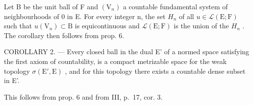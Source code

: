 Let B be the unit ball of F and \((\mathrm{V}_{n})\) a countable fundamental system of neighbourhoods of 0 in E. For every integer n, the set \(H_{n}\) of all \(u \in \mathcal{L}(\mathrm{E}; \mathrm{F})\) such that \(u(\mathrm{V}_{n}) \subset \mathrm{B}\) is equicontinuous and \(\mathcal{L}(\mathrm{E}; \mathrm{F})\) is the union of the \(H_{n}\) . The corollary then follows from prop. 6.

COROLLARY 2. --- Every closed ball in the dual E' of a normed space satisfying the first axiom of countability, is a compact metrizable space for the weak topology \(\sigma(\mathrm{E}',\mathrm{E})\) , and for this topology there exists a countable dense subset in E'.

This follows from prop. 6 and from III, p.~17, cor. 3.

